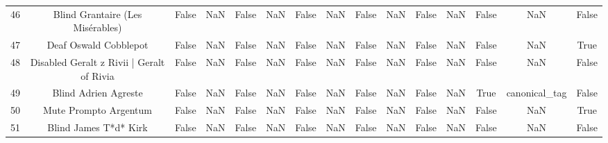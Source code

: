 \begin{table}[h!]
{\begin{tabular}{|c|c|c|c|c|c|c|c|c|c|c|c|c|c|c|}
         46 &                  Blind Grantaire (Les Misérables) &                          False &                       NaN &                          False &                       NaN &                          False &                       NaN &                          False &                       NaN &                          False &                       NaN &                          False &                       NaN &                          False \\
         47 &                             Deaf Oswald Cobblepot &                          False &                       NaN &                          False &                       NaN &                          False &                       NaN &                          False &                       NaN &                          False &                       NaN &                          False &                       NaN &                           True \\
         48 &         Disabled Geralt z Rivii | Geralt of Rivia &                          False &                       NaN &                          False &                       NaN &                          False &                       NaN &                          False &                       NaN &                          False &                       NaN &                          False &                       NaN &                          False \\
         49 &                              Blind Adrien Agreste &                          False &                       NaN &                          False &                       NaN &                          False &                       NaN &                          False &                       NaN &                          False &                       NaN &                           True &             canonical\_tag &                          False \\
         50 &                             Mute Prompto Argentum &                          False &                       NaN &                          False &                       NaN &                          False &                       NaN &                          False &                       NaN &                          False &                       NaN &                          False &                       NaN &                           True \\
         51 &                             Blind James T*d* Kirk &                          False &                       NaN &                          False &                       NaN &                          False &                       NaN &                          False &                       NaN &                          False &                       NaN &                          False &                       NaN &                          False \\

\end{tabular}}
\end{table}
